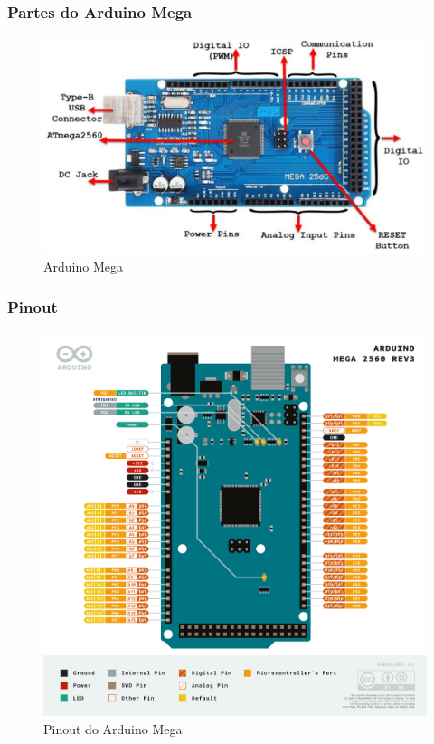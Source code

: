 \documentclass[12pt]{beamer}
\begin{document}
\begin{frame}
    \frametitle{Partes do Arduino Mega}

    \begin{figure}
        \centering
        \includegraphics[height=.68\textheight]{partes_arduino_mega}
        \caption{Arduino Mega}
    \end{figure}

\end{frame}

\begin{frame}
    \frametitle{Pinout}
    \begin{figure}
        \centering
        \includegraphics[height=.68\textheight]{Pinout-Mega2560}
        \caption{Pinout do Arduino Mega}
    \end{figure}
\end{frame}
\end{document}
